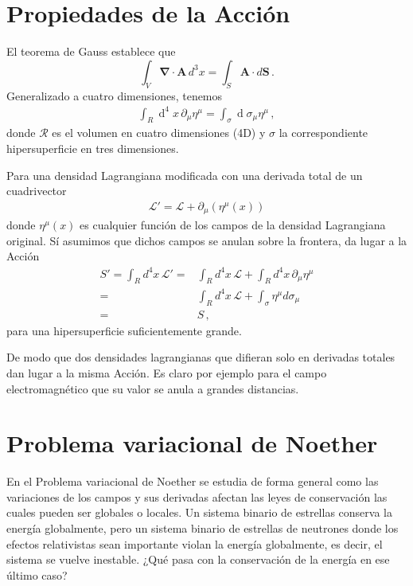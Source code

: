 \section{Propiedades de la Acción}


\begin{frame}
El teorema de Gauss establece que
\begin{equation}
\int_V\boldsymbol{\nabla}\cdot\mathbf{A}\,d^3x=
 \int_S\mathbf{A}\cdot d\mathbf{S}\,.
\end{equation}
Generalizado a cuatro dimensiones, tenemos
\begin{align}
  \label{eq:gauss4d}
\int_{R} \operatorname{d}^4x\,\partial_{\mu} \eta^{\mu}=
\int_{\sigma} \operatorname{d}\sigma_{\mu} \eta^{\mu}\,,   
\end{align}
donde $\mathcal{R}$ es el volumen en cuatro dimensiones (4D) y $\sigma$ la correspondiente hipersuperficie en tres dimensiones.
\end{frame}

\begin{frame}
Para una densidad Lagrangiana modificada con una derivada total de un cuadrivector
\begin{align}
  \mathcal{L}'=\mathcal{L}+\partial_\mu(\eta^{\mu}(x))
\end{align}
donde $\eta^{\mu}(x)$ es cualquier función de los campos de la densidad Lagrangiana original. Sí asumimos que dichos campos se anulan  sobre la frontera, da lugar a la Acción
\begin{align}
  S'=\int_{R}d^4x\,\mathcal{L}'=&\int_{R}d^4x\,\mathcal{L}+\int_R d^4x\,\partial_\mu\eta^{\mu}\nonumber\\
  =&\int_{R}d^4x\,\mathcal{L}+\int_\sigma \eta^{\mu} d\sigma_{\mu}\nonumber\\
  =&S\,,
\end{align}
para una hipersuperficie suficientemente grande.
\end{frame}
De modo que dos densidades lagrangianas que difieran solo en derivadas totales dan lugar a la misma Acción. Es claro por ejemplo para el campo electromagnético que su valor se anula a grandes distancias.

\section{Problema variacional de Noether}
\label{sec:principio-de-minima-call}


En el Problema variacional de Noether se estudia de forma general como las variaciones de los campos y sus derivadas afectan las leyes de conservación las cuales pueden ser globales o locales. Un sistema binario de estrellas conserva la energía globalmente, pero un sistema binario de estrellas de neutrones donde los efectos relativistas sean importante violan la energía globalmente, es decir, el sistema se vuelve inestable. ¿Qué pasa con la conservación de la energía en ese último caso?



